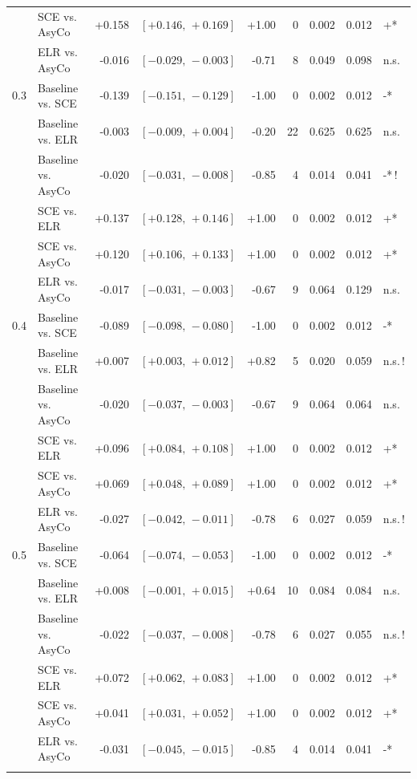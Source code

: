 \begin{small}
\begin{longtable}{llrrrrrrl}
 & SCE vs. AsyCo & +0.158 & $[+0.146,\,+0.169]$ & +1.00 & 0 & 0.002 & 0.012 & +* \\
 & ELR vs. AsyCo & -0.016 & $[-0.029,\,-0.003]$ & -0.71 & 8 & 0.049 & 0.098 & n.s. \\
0.3 & Baseline vs. SCE & -0.139 & $[-0.151,\,-0.129]$ & -1.00 & 0 & 0.002 & 0.012 & -* \\
 & Baseline vs. ELR & -0.003 & $[-0.009,\,+0.004]$ & -0.20 & 22 & 0.625 & 0.625 & n.s. \\
 & Baseline vs. AsyCo & -0.020 & $[-0.031,\,-0.008]$ & -0.85 & 4 & 0.014 & 0.041 & -*\,! \\
 & SCE vs. ELR & +0.137 & $[+0.128,\,+0.146]$ & +1.00 & 0 & 0.002 & 0.012 & +* \\
 & SCE vs. AsyCo & +0.120 & $[+0.106,\,+0.133]$ & +1.00 & 0 & 0.002 & 0.012 & +* \\
 & ELR vs. AsyCo & -0.017 & $[-0.031,\,-0.003]$ & -0.67 & 9 & 0.064 & 0.129 & n.s. \\
0.4 & Baseline vs. SCE & -0.089 & $[-0.098,\,-0.080]$ & -1.00 & 0 & 0.002 & 0.012 & -* \\
 & Baseline vs. ELR & +0.007 & $[+0.003,\,+0.012]$ & +0.82 & 5 & 0.020 & 0.059 & n.s.\,! \\
 & Baseline vs. AsyCo & -0.020 & $[-0.037,\,-0.003]$ & -0.67 & 9 & 0.064 & 0.064 & n.s. \\
 & SCE vs. ELR & +0.096 & $[+0.084,\,+0.108]$ & +1.00 & 0 & 0.002 & 0.012 & +* \\
 & SCE vs. AsyCo & +0.069 & $[+0.048,\,+0.089]$ & +1.00 & 0 & 0.002 & 0.012 & +* \\
 & ELR vs. AsyCo & -0.027 & $[-0.042,\,-0.011]$ & -0.78 & 6 & 0.027 & 0.059 & n.s.\,! \\
0.5 & Baseline vs. SCE & -0.064 & $[-0.074,\,-0.053]$ & -1.00 & 0 & 0.002 & 0.012 & -* \\
 & Baseline vs. ELR & +0.008 & $[-0.001,\,+0.015]$ & +0.64 & 10 & 0.084 & 0.084 & n.s. \\
 & Baseline vs. AsyCo & -0.022 & $[-0.037,\,-0.008]$ & -0.78 & 6 & 0.027 & 0.055 & n.s.\,! \\
 & SCE vs. ELR & +0.072 & $[+0.062,\,+0.083]$ & +1.00 & 0 & 0.002 & 0.012 & +* \\
 & SCE vs. AsyCo & +0.041 & $[+0.031,\,+0.052]$ & +1.00 & 0 & 0.002 & 0.012 & +* \\
 & ELR vs. AsyCo & -0.031 & $[-0.045,\,-0.015]$ & -0.85 & 4 & 0.014 & 0.041 & -* \\
\addlinespace
\multicolumn{9}{l}{\textit{Macro AUC}} \\

\end{longtable}
\end{small}
